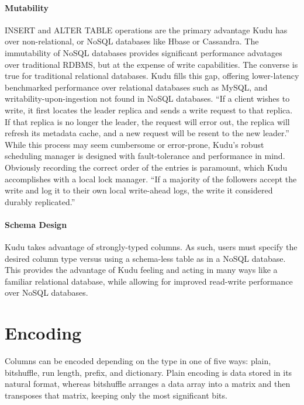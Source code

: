 \paragraph{Mutability} 
INSERT and ALTER TABLE operations are the primary advantage Kudu has over non-relational, or NoSQL databases like Hbase or Cassandra. The immutability of NoSQL databases provides significant performance advatages over traditional RDBMS, but at the expense of write capabilities. The converse is true for traditional relational databases.  Kudu fills this gap, offering lower-latency benchmarked performance over relational databases such as MySQL, and writability-upon-ingestion not found in NoSQL databases. ``If a client wishes to write, it first locates the leader replica and sends a write request to that replica. If that replica is no longer the leader, the request will error out, the replica will refresh its metadata cache, and a new request will be resent to the new leader.'' ~\cite{hid-sp18-407-kudu-intro} While this process may seem cumbersome or error-prone, Kudu's robust scheduling manager is designed with fault-tolerance and performance in mind. Obviously recording the correct order of the entries is paramount, which Kudu accomplishes with a local lock manager. ``If a majority of the followers accept the write and log it to their own local write-ahead logs, the write it considered durably replicated.'' ~\cite{hid-sp18-407-kudu-intro}

\paragraph{Schema Design} 
Kudu takes advantage of strongly-typed columns. As such, users must specify the desired column type versus using a schema-less table as in a NoSQL database.  This provides the advantage of Kudu feeling and acting in many ways like a familiar relational database, while allowing for improved read-write performance over NoSQL databases. ~\cite{hid-sp18-407-kudu-schema-design}

\section{Encoding} 
Columns can be encoded depending on the type in one of five ways: plain, bitshuffle, run length, prefix, and dictionary. Plain encoding is data stored in its natural format, whereas bitshuffle arranges a data array into a matrix and then transposes that matrix, keeping only the most significant bits. ~\cite{hid-sp18-407-bitshuffle}


